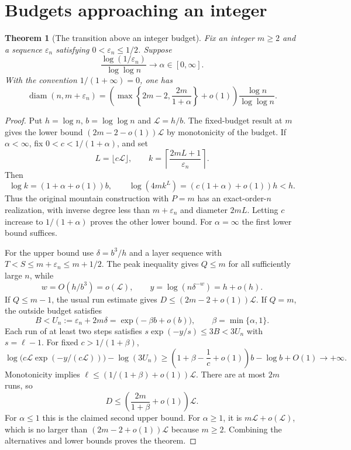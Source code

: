 \documentclass[11pt]{amsart}
\newtheorem{theorem}{Theorem}[section]
\theoremstyle{definition}
\theoremstyle{remark}
\newcommand{\diam}{\operatorname{diam}}
\begin{document}
\section{Budgets approaching an integer}\label{sec:transition}

\begin{theorem}[The transition above an integer budget]\label{thm:transition}
Fix an integer $m\ge2$ and a sequence $\varepsilon_n$ satisfying
$0<\varepsilon_n\le1/2$.  Suppose
\[
 \frac{\log(1/\varepsilon_n)}{\log\log n}\longrightarrow
 \alpha\in[0,\infty].
\]
With the convention $1/(1+\infty)=0$, one has
\[
 \diam(n,m+\varepsilon_n)
 =\left(\max\left\{2m-2,\frac{2m}{1+\alpha}\right\}+o(1)\right)
 \frac{\log n}{\log\log n}.
\]
\end{theorem}

\begin{proof}
Put $h=\log n$, $b=\log\log n$ and $\mathcal L=h/b$.
The fixed-budget result at $m$ gives the lower bound
$(2m-2-o(1))\mathcal L$ by monotonicity of the budget.
If $\alpha<\infty$, fix $0<c<1/(1+\alpha)$, and set
\[
 L=\lfloor c\mathcal L\rfloor,
 \qquad
 k=\left\lceil\frac{2mL+1}{\varepsilon_n}\right\rceil.
\]
Then
\[
 \log k=(1+\alpha+o(1))b,
 \qquad
 \log(4mk^L)=(c(1+\alpha)+o(1))h<h.
\]
Thus the original mountain construction with $P=m$ has an exact-order-$n$
realization, with inverse degree less than $m+\varepsilon_n$ and diameter
$2mL$.  Letting $c$ increase to $1/(1+\alpha)$ proves the other lower
bound.  For $\alpha=\infty$ the first lower bound suffices.

For the upper bound use $\delta=b^3/h$ and a layer sequence with
$T<S\le m+\varepsilon_n\le m+1/2$.  The peak inequality gives $Q\le m$
for all sufficiently large $n$, while
\[
 w=O(h/b^3)=o(\mathcal L),
 \qquad
 y=\log(n\delta^{-w})=h+o(h).
\]
If $Q\le m-1$, the usual run estimate gives
$D\le(2m-2+o(1))\mathcal L$.
If $Q=m$, the outside budget satisfies
\[
 B<U_n:=\varepsilon_n+2m\delta
   =\exp\bigl(-\beta b+o(b)\bigr),
 \qquad \beta=\min\{\alpha,1\}.
\]
Each run of at least two steps satisfies
$s\exp(-y/s)\le3B<3U_n$ with $s=\ell-1$.
For fixed $c>1/(1+\beta)$,
\[
 \log\bigl(c\mathcal L\exp(-y/(c\mathcal L))\bigr)
 -\log(3U_n)
 \ge\left(1+\beta-\frac1c+o(1)\right)b-\log b+O(1)
 \longrightarrow+\infty.
\]
Monotonicity implies
$\ell\le(1/(1+\beta)+o(1))\mathcal L$.
There are at most $2m$ runs, so
\[
 D\le\left(\frac{2m}{1+\beta}+o(1)\right)\mathcal L.
\]
For $\alpha\le1$ this is the claimed second upper bound.
For $\alpha\ge1$, it is $m\mathcal L+o(\mathcal L)$, which is no larger
than $(2m-2+o(1))\mathcal L$ because $m\ge2$.
Combining the alternatives and lower bounds proves the theorem.
\end{proof}
\end{document}
